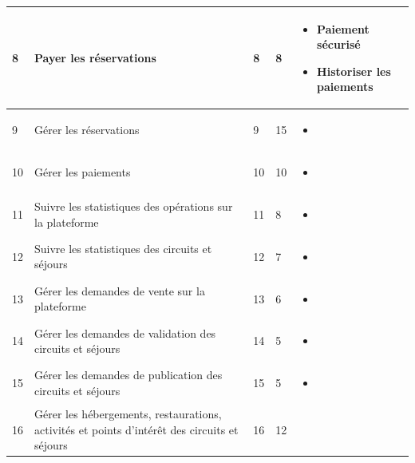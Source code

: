 \documentclass[12pt]{report}
\begin{document}
\begin{longtable}{|p{1cm}|p{3cm}|p{2cm}|p{2cm}|p{6cm}|}
						\hline
						 8&Payer les réservations&8&8&
						\begin{itemize}
							\item Paiement sécurisé
							\item Historiser les paiements
						\end{itemize}
						\\
						\hline
						 9&Gérer les réservations&9&15&
						\begin{itemize}
							\item
						\end{itemize}
						\\
						\hline
						 10&Gérer les paiements&10&10&
						\begin{itemize}
							\item
						\end{itemize}
						\\
						\hline
						 11&Suivre les statistiques des opérations sur la plateforme&11&8&
						\begin{itemize}
							\item
						\end{itemize}
						\\
						\hline
						 12&Suivre les statistiques des circuits et séjours&12&7&
						\begin{itemize}
							\item
						\end{itemize}
						\\
						\hline
						 13&Gérer les demandes de vente sur la plateforme&13&6&
						\begin{itemize}
							\item
						\end{itemize}
						\\
						\hline
						 14&Gérer les demandes de validation des circuits et séjours&14&5&
						\begin{itemize}
							\item
						\end{itemize}
						\\
						\hline
						 15&Gérer les demandes de publication des circuits et séjours&15&5&
						\begin{itemize}
							\item
						\end{itemize}
						\\
						\hline
						 16&Gérer les hébergements, restaurations, activités et points d'intérêt des circuits et séjours&16&12&
						\begin{itemize}

\end{itemize}
\end{longtable}
\end{document}
